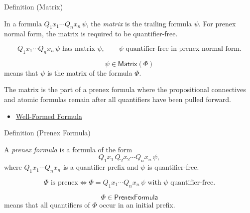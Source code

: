 \begin{definitionbox}{Definition (Matrix)}
\begin{definition}[Matrix]
\label{def:matrix-prenex}
In a formula \(Q_1x_1\cdots Q_nx_n\,\psi\), the \emph{matrix} is the trailing
formula \(\psi\). For prenex normal form, the matrix is required to be
quantifier-free.
\end{definition}
\end{definitionbox}

\begin{remark*}
\[
Q_1x_1\cdots Q_nx_n\,\psi \text{ has matrix } \psi,
\qquad
\psi \text{ quantifier-free in prenex normal form.}
\]
\end{remark*}

\begin{remark*}
\[
  \psi\in\mathsf{Matrix}(\Phi)
\] means that \(\psi\) is the matrix of the
formula \(\Phi\).
\end{remark*}

\begin{remark*}[Interpretation]
The matrix is the part of a prenex formula where the propositional connectives
and atomic formulas remain after all quantifiers have been pulled forward.
\end{remark*}

\begin{dependencies}
\begin{itemize}
  \item \hyperref[def:wff-pred]{Well-Formed Formula}
\end{itemize}
\end{dependencies}

\begin{definitionbox}{Definition (Prenex Formula)}
\begin{definition}
\label{def:prenex-formula}
A \emph{prenex formula} is a formula of the form
\[
Q_1x_1\,Q_2x_2\cdots Q_nx_n\,\psi,
\]
where \(Q_1x_1\cdots Q_nx_n\) is a quantifier prefix and \(\psi\) is
quantifier-free.
\end{definition}
\end{definitionbox}

\begin{remark*}
\[
\Phi \text{ is prenex}
\Longleftrightarrow
\Phi=Q_1x_1\cdots Q_nx_n\,\psi
\text{ with } \psi \text{ quantifier-free.}
\]
\end{remark*}

\begin{remark*}
\[
  \Phi\in\mathsf{PrenexFormula}
\] means that all quantifiers of \(\Phi\)
occur in an initial prefix.
\end{remark*}


